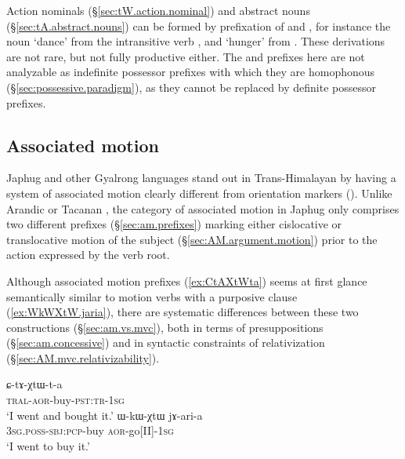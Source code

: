 Action nominals (§\ref{sec:tW.action.nominal}) and abstract nouns (§\ref{sec:tA.abstract.nouns}) can be formed by prefixation of  and , for instance the noun  `dance' from the intransitive verb , and  `hunger' from . These derivations are not rare, but not fully productive either. The  and  prefixes here are not analyzable as indefinite possessor prefixes with which they are homophonous (§\ref{sec:possessive.paradigm}), as they cannot be replaced by definite possessor prefixes.

\subsection{Associated motion} \label{sec:am.intro}
Japhug and other Gyalrong languages stand out in Trans-Himalayan by having a system of associated motion clearly different from orientation markers (\citealt{jacques20am-st}). Unlike Arandic \citep{koch84associated.motion} or Tacanan \citep{guillaume09mouv.assoc}, the category of associated motion in Japhug only comprises two different prefixes (§\ref{sec:am.prefixes}) marking either cislocative or translocative motion of the subject (§\ref{sec:AM.argument.motion}) prior to the action expressed by the verb root.

Although associated motion prefixes (\ref{ex:CtAXtWta}) seems at first glance semantically similar to motion verbs with a purposive clause (\ref{ex:WkWXtW.jaria}), there are systematic differences between these two constructions (§\ref{sec:am.vs.mvc}), both in terms of presuppositions (§\ref{sec:am.concessive}) and in syntactic constraints of relativization (§\ref{sec:AM.mvc.relativizability}).

\begin{exe} 
\ex 
\begin{xlist}
\ex \label{ex:CtAXtWta}
\gll ɕ-tɤ-χtɯ-t-a   \\
\textsc{tral}-\textsc{aor}-buy-\textsc{pst}:\textsc{tr}-\textsc{1sg} \\
\glt `I went and bought it.' 
\ex \label{ex:WkWXtW.jaria}
\gll ɯ-kɯ-χtɯ jɤ-ari-a \\
\textsc{3sg}.\textsc{poss}-\textsc{sbj}:\textsc{pcp}-buy \textsc{aor}-go[II]-\textsc{1sg} \\
\glt `I went to buy it.' 
\end{xlist}
\end{exe} 

